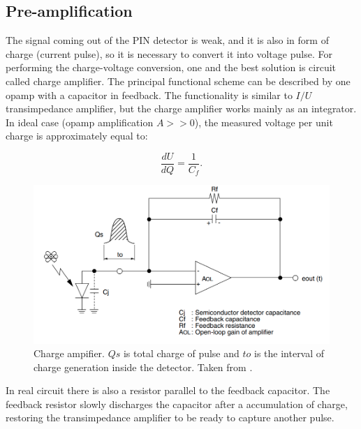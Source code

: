 \subsection{Pre-amplification}
The signal coming out of the PIN detector is weak, and it is also in form of charge (current pulse), so it is necessary to convert it into voltage pulse. For performing the charge-voltage conversion, one and the best solution is circuit called charge amplifier. The principal functional scheme can be described by one opamp with a capacitor in feedback. The functionality is similar to $I/U$ transimpedance amplifier, but the charge amplifier works mainly as an integrator. In ideal case (opamp amplification $A >> 0$), the measured voltage per unit charge is approximately equal to:

\begin{equation}
\frac{dU}{dQ} = \frac{1}{C_{f}}.
\end{equation}


\begin{figure}[H]
 \centering
 \includegraphics[scale=0.4, angle = 0]{./pictures/champlifier.png}
 \caption{Charge ampifier. $Qs$ is total charge of pulse and $to$ is the interval of charge generation inside the detector. Taken from \cite{charge}.}
 \label{trans}
 
\end{figure}



\par
In real circuit there is also a resistor parallel to the feedback capacitor. The feedback resistor slowly discharges the capacitor after a accumulation of charge, restoring the transimpedance amplifier to be ready to capture another pulse.

